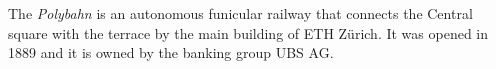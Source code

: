 The \emph{Polybahn} is an autonomous funicular railway that connects the Central square with the terrace by the main building of ETH Zürich. It was opened in 1889 and it is owned by the banking group UBS AG.
